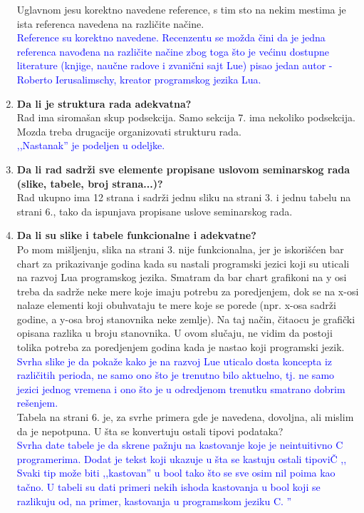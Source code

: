 \documentclass[a4paper]{report}
\newcommand{\odgovorAutora}[1]{\textcolor{blue}{#1}}
\begin{document}
\begin{enumerate}
  Uglavnom jesu korektno navedene reference, s tim sto na nekim mestima je ista referenca navedena na razli\v cite na\v cine. \\
\odgovorAutora{Reference su korektno navedene. Recenzentu se možda čini da je jedna referenca navođena na različite načine zbog toga što je većinu dostupne literature (knjige, naučne radove i zvanični sajt Lue) pisao jedan autor - Roberto Ierusalimschy, kreator programskog jezika Lua.}
\item \textbf {Da li je struktura rada adekvatna?}\\
  Rad ima siroma\v san skup podsekcija. Samo sekcija 7. ima nekoliko podsekcija. Mozda treba drugacije organizovati strukturu rada. \\
\odgovorAutora{,,Nastanak'' je podeljen u odeljke.}
\item \textbf {Da li rad sadrži sve elemente propisane uslovom seminarskog rada (slike, tabele, broj strana...)?}\\
  Rad ukupno ima 12 strana i sadr\v zi jednu sliku na strani 3. i jednu tabelu na strani 6., tako da ispunjava propisane uslove seminarskog rada.
\item \textbf {Da li su slike i tabele funkcionalne i adekvatne?}\\
  Po mom mi\v sljenju, slika na strani 3. nije funkcionalna, jer je iskori\v s\' cen bar chart za prikazivanje godina kada su nastali programski jezici koji su uticali na razvoj Lua programskog jezika. Smatram da bar chart grafikoni na y osi treba da sadr\v ze neke mere koje imaju potrebu za poredjenjem, dok se na x-osi nalaze elementi koji obuhvataju te mere koje se porede (npr. x-osa sadr\v zi godine, a y-osa broj stanovnika neke zemlje). Na taj na\v cin, \v citaocu je grafi\v cki opisana razlika u
    broju stanovnika. U ovom slu\v caju, ne vidim da postoji tolika potreba za poredjenjem godina kada je nastao koji programski jezik.\\
\odgovorAutora{Svrha slike je da pokaže kako je na razvoj Lue uticalo dosta koncepta iz različitih perioda, ne samo ono što je trenutno bilo aktuelno, tj. ne samo jezici jednog vremena i ono što je u odredjenom trenutku smatrano dobrim rešenjem.} \\
  Tabela na strani 6. je, za svrhe primera gde je navedena, dovoljna, ali mislim da je nepotpuna. U \v sta se konvertuju ostali tipovi podataka? \\
\odgovorAutora{Svrha date tabele je da skrene pažnju na kastovanje koje je neintuitivno C programerima. Dodat je tekst koji ukazuje u šta se kastuju ostali tipoviČ ,, Svaki tip može biti ,,kastovan'' u bool tako što se sve osim nil poima kao tačno. U tabeli su dati primeri nekih ishoda kastovanja u bool koji se razlikuju od, na primer, kastovanja u programskom jeziku C. ''}
\end{enumerate}
\end{document}

